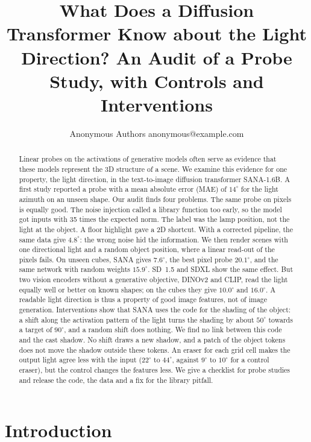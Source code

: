 \documentclass[10pt]{article}
\title{What Does a Diffusion Transformer Know about the Light Direction? An Audit of a Probe Study, with Controls and Interventions}
\author{\name Anonymous Authors \email anonymous@example.com}
\newcommand{\degr}{^\circ}
\begin{document}
\maketitle

\begin{abstract}
Linear probes on the activations of generative models often serve as evidence that these models represent the 3D structure of a scene.
We examine this evidence for one property, the light direction, in the text-to-image diffusion transformer SANA-1.6B.
A first study reported a probe with a mean absolute error (MAE) of $14\degr$ for the light azimuth on an unseen shape.
Our audit finds four problems.
The same probe on pixels is equally good.
The noise injection called a library function too early, so the model got inputs with 35 times the expected norm.
The label was the lamp position, not the light at the object.
A floor highlight gave a 2D shortcut.
With a corrected pipeline, the same data give $4.8\degr$: the wrong noise hid the information.
We then render scenes with one directional light and a random object position, where a linear read-out of the pixels fails.
On unseen cubes, SANA gives $7.6\degr$, the best pixel probe $20.1\degr$, and the same network with random weights $15.9\degr$.
SD~1.5 and SDXL show the same effect.
But two vision encoders without a generative objective, DINOv2 and CLIP, read the light equally well or better on known shapes; on the cubes they give $10.0\degr$ and $16.0\degr$.
A readable light direction is thus a property of good image features, not of image generation.
Interventions show that SANA uses the code for the shading of the object: a shift along the activation pattern of the light turns the shading by about $50\degr$ towards a target of $90\degr$, and a random shift does nothing.
We find no link between this code and the cast shadow. No shift draws a new shadow, and a patch of the object tokens does not move the shadow outside these tokens.
An eraser for each grid cell makes the output light agree less with the input ($22\degr$ to $44\degr$, against $9\degr$ to $10\degr$ for a control eraser), but the control changes the features less.
We give a checklist for probe studies and release the code, the data and a fix for the library pitfall.
\end{abstract}

\section{Introduction}
\label{sec:intro}
\end{document}
